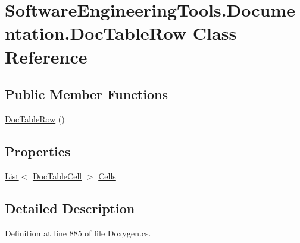 \hypertarget{class_software_engineering_tools_1_1_documentation_1_1_doc_table_row}{\section{Software\+Engineering\+Tools.\+Documentation.\+Doc\+Table\+Row Class Reference}
\label{class_software_engineering_tools_1_1_documentation_1_1_doc_table_row}
}
\subsection*{Public Member Functions}
\begin{DoxyCompactItemize}
\item 
\hyperlink{class_software_engineering_tools_1_1_documentation_1_1_doc_table_row_ae53e40202ea4b80655dc566d4ed8f28d}{Doc\+Table\+Row} ()
\end{DoxyCompactItemize}
\subsection*{Properties}
\begin{DoxyCompactItemize}
\item 
\hyperlink{namespace_software_engineering_tools_1_1_documentation_ae0bccf4f49a76db084c1c316e5954ec9a4ee29ca12c7d126654bd0e5275de6135}{List}$<$ \hyperlink{class_software_engineering_tools_1_1_documentation_1_1_doc_table_cell}{Doc\+Table\+Cell} $>$ \hyperlink{class_software_engineering_tools_1_1_documentation_1_1_doc_table_row_af7846b3111ccb5fc1821cacfdeda7b12}{Cells}
\end{DoxyCompactItemize}


\subsection{Detailed Description}


Definition at line 885 of file Doxygen.\+cs.



